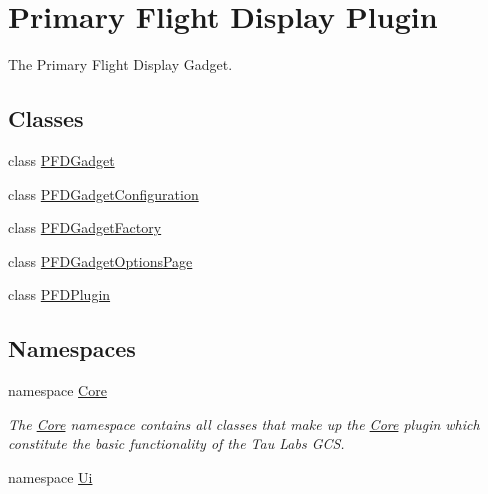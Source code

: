 \hypertarget{group___p_f_d_plugin}{\section{\-Primary \-Flight \-Display \-Plugin}
\label{group___p_f_d_plugin}
}


\-The \-Primary \-Flight \-Display \-Gadget.  


\subsection*{\-Classes}
\begin{DoxyCompactItemize}
\item 
class \hyperlink{class_p_f_d_gadget}{\-P\-F\-D\-Gadget}
\item 
class \hyperlink{class_p_f_d_gadget_configuration}{\-P\-F\-D\-Gadget\-Configuration}
\item 
class \hyperlink{class_p_f_d_gadget_factory}{\-P\-F\-D\-Gadget\-Factory}
\item 
class \hyperlink{class_p_f_d_gadget_options_page}{\-P\-F\-D\-Gadget\-Options\-Page}
\item 
class \hyperlink{class_p_f_d_plugin}{\-P\-F\-D\-Plugin}
\end{DoxyCompactItemize}
\subsection*{\-Namespaces}
\begin{DoxyCompactItemize}
\item 
namespace \hyperlink{namespace_core}{\-Core}
\begin{DoxyCompactList}\small\item\em \-The \hyperlink{namespace_core}{\-Core} namespace contains all classes that make up the \hyperlink{namespace_core}{\-Core} plugin which constitute the basic functionality of the \-Tau \-Labs \-G\-C\-S. \end{DoxyCompactList}\item 
namespace \hyperlink{namespace_ui}{\-Ui}
\end{DoxyCompactItemize}
